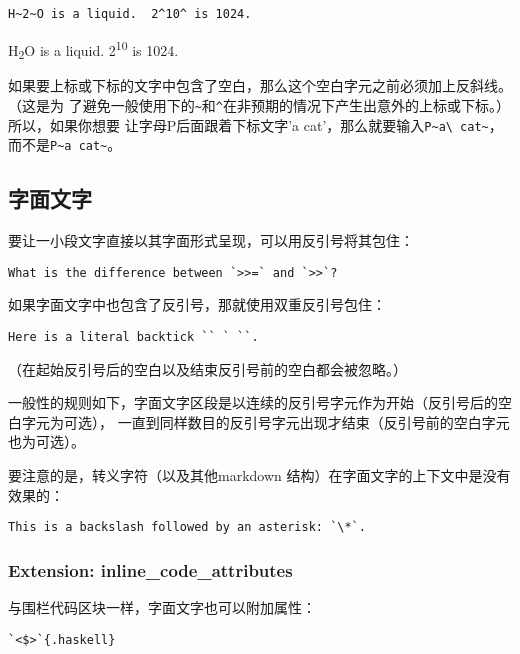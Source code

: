\documentclass[fancyhdr,bookmark]{ctexbook}
\begin{document}
\begin{lstlisting}
H~2~O is a liquid.  2^10^ is 1024.
\end{lstlisting}

H\textsubscript{2}O is a liquid. 2\textsuperscript{10} is 1024.

如果要上标或下标的文字中包含了空白，那么这个空白字元之前必须加上反斜线。（这是为
了避免一般使用下的\lstinline!~!和\lstinline!^!在非预期的情况下产生出意外的上标或下标。）所以，如果你想要
让字母P后面跟着下标文字'a
cat'，那么就要输入\lstinline!P~a\ cat~!，而不是\lstinline!P~a cat~!。

\subsection{字面文字}\label{ux5b57ux9762ux6587ux5b57}

要让一小段文字直接以其字面形式呈现，可以用反引号将其包住：

\begin{lstlisting}
What is the difference between `>>=` and `>>`?
\end{lstlisting}

如果字面文字中也包含了反引号，那就使用双重反引号包住：

\begin{lstlisting}
Here is a literal backtick `` ` ``.
\end{lstlisting}

（在起始反引号后的空白以及结束反引号前的空白都会被忽略。）

一般性的规则如下，字面文字区段是以连续的反引号字元作为开始（反引号后的空白字元为可选），
一直到同样数目的反引号字元出现才结束（反引号前的空白字元也为可选）。

要注意的是，转义字符（以及其他markdown
结构）在字面文字的上下文中是没有效果的：

\begin{lstlisting}
This is a backslash followed by an asterisk: `\*`.
\end{lstlisting}

\subsubsection{Extension:
inline\_code\_attributes}\label{extension-inline_code_attributes}

与围栏代码区块一样，字面文字也可以附加属性：

\begin{lstlisting}
`<$>`{.haskell}
\end{lstlisting}
\end{document}

